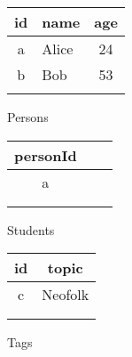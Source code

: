 \begin{figure}[htb]
	\begin{subfigure}[b]{0.22\textwidth}
		\begin{center}
			\begin{tabular}{|c|l|c|}
				\hline
				id & \multicolumn{1}{|c|}{name} & age \\
				\hline
				a & Alice & 24 \\
				\hline
				b & Bob & 53 \\
				\hline \\
			\end{tabular}
			\caption{\textsf{Persons}}
			\label{example-rdb-persons}
		\end{center}
	\end{subfigure}
	\begin{subfigure}[b]{0.16\textwidth}
	\begin{center}
		\begin{tabular}{|c|c|c|}
			\hline
			personId \\
			\hline
			a \\
			\hline \\ \\
		\end{tabular}
		\caption{\textsf{Students}}
		\label{example-rdb-students}
	\end{center}
	\end{subfigure}
	\begin{subfigure}[b]{0.2\textwidth}
		\begin{center}
			\begin{tabular}{|c|l|}
				\hline
				id & \multicolumn{1}{|c|}{topic} \\
				\hline
				c & Neofolk \\
				\hline \\ \\
			\end{tabular}
			\caption{\textsf{Tags}}
			\label{example-rdb-tags}
		\end{center}
	\end{subfigure}
	\begin{subfigure}[b]{0.2\textwidth}
		\begin{center}
			\begin{tabular}{|c|l|}

\end{tabular}
\end{center}
\end{subfigure}
\end{figure}
